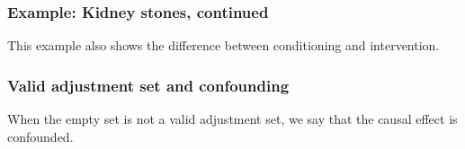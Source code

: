 \documentclass{beamer}
\begin{document}
\begin{frame}
    \frametitle{Example: Kidney stones, continued}
    \begin{flushleft}
        This example also shows the difference between conditioning and intervention.
    \end{flushleft}
\end{frame}

\begin{frame}
    \frametitle{Valid adjustment set and confounding}
    \begin{flushleft}
        When the empty set is not a valid adjustment set, we say that the causal effect is confounded.
    \end{flushleft}
\end{frame}
\end{document}
